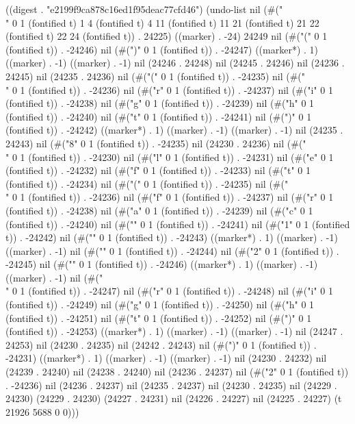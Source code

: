 
((digest . "e2199f9ca878c16ed1f95deac77cfd46") (undo-list nil (#("
\\[
 \\left\\{\\right\\} 
\\]" 0 1 (fontified t) 1 4 (fontified t) 4 11 (fontified t) 11 21 (fontified t) 21 22 (fontified t) 22 24 (fontified t)) . 24225) ((marker) . -24) 24249 nil (#("(" 0 1 (fontified t)) . -24246) nil (#(")" 0 1 (fontified t)) . -24247) ((marker*) . 1) ((marker) . -1) ((marker) . -1) nil (24246 . 24248) nil (24245 . 24246) nil (24236 . 24245) nil (24235 . 24236) nil (#("(" 0 1 (fontified t)) . -24235) nil (#("\\" 0 1 (fontified t)) . -24236) nil (#("r" 0 1 (fontified t)) . -24237) nil (#("i" 0 1 (fontified t)) . -24238) nil (#("g" 0 1 (fontified t)) . -24239) nil (#("h" 0 1 (fontified t)) . -24240) nil (#("t" 0 1 (fontified t)) . -24241) nil (#(")" 0 1 (fontified t)) . -24242) ((marker*) . 1) ((marker) . -1) ((marker) . -1) nil (24235 . 24243) nil (#("8" 0 1 (fontified t)) . -24235) nil (24230 . 24236) nil (#("\\" 0 1 (fontified t)) . -24230) nil (#("l" 0 1 (fontified t)) . -24231) nil (#("e" 0 1 (fontified t)) . -24232) nil (#("f" 0 1 (fontified t)) . -24233) nil (#("t" 0 1 (fontified t)) . -24234) nil (#("(" 0 1 (fontified t)) . -24235) nil (#("\\" 0 1 (fontified t)) . -24236) nil (#("f" 0 1 (fontified t)) . -24237) nil (#("r" 0 1 (fontified t)) . -24238) nil (#("a" 0 1 (fontified t)) . -24239) nil (#("c" 0 1 (fontified t)) . -24240) nil (#("{" 0 1 (fontified t)) . -24241) nil (#("1" 0 1 (fontified t)) . -24242) nil (#("}" 0 1 (fontified t)) . -24243) ((marker*) . 1) ((marker) . -1) ((marker) . -1) nil (#("{" 0 1 (fontified t)) . -24244) nil (#("2" 0 1 (fontified t)) . -24245) nil (#("}" 0 1 (fontified t)) . -24246) ((marker*) . 1) ((marker) . -1) ((marker) . -1) nil (#("\\" 0 1 (fontified t)) . -24247) nil (#("r" 0 1 (fontified t)) . -24248) nil (#("i" 0 1 (fontified t)) . -24249) nil (#("g" 0 1 (fontified t)) . -24250) nil (#("h" 0 1 (fontified t)) . -24251) nil (#("t" 0 1 (fontified t)) . -24252) nil (#(")" 0 1 (fontified t)) . -24253) ((marker*) . 1) ((marker) . -1) ((marker) . -1) nil (24247 . 24253) nil (24230 . 24235) nil (24242 . 24243) nil (#(")" 0 1 (fontified t)) . -24231) ((marker*) . 1) ((marker) . -1) ((marker) . -1) nil (24230 . 24232) nil (24239 . 24240) nil (24238 . 24240) nil (24236 . 24237) nil (#("2" 0 1 (fontified t)) . -24236) nil (24236 . 24237) nil (24235 . 24237) nil (24230 . 24235) nil (24229 . 24230) (24229 . 24230) (24227 . 24231) nil (24226 . 24227) nil (24225 . 24227) (t 21926 5688 0 0)))
